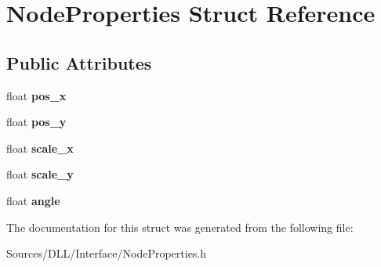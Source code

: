 \hypertarget{struct_node_properties}{}\section{Node\+Properties Struct Reference}
\label{struct_node_properties}
\subsection*{Public Attributes}
\begin{DoxyCompactItemize}
\item 
\hypertarget{struct_node_properties_a5c3926e71b48fc207c660879d3605b9c}{}float {\bfseries pos\+\_\+x}\label{struct_node_properties_a5c3926e71b48fc207c660879d3605b9c}

\item 
\hypertarget{struct_node_properties_ac367066fcf3484c36f71b9f8907207bc}{}float {\bfseries pos\+\_\+y}\label{struct_node_properties_ac367066fcf3484c36f71b9f8907207bc}

\item 
\hypertarget{struct_node_properties_a49637b6297462ecd714bf0cdf9584381}{}float {\bfseries scale\+\_\+x}\label{struct_node_properties_a49637b6297462ecd714bf0cdf9584381}

\item 
\hypertarget{struct_node_properties_a0efed2f7fd0a28c6a3a58bbf5e771d53}{}float {\bfseries scale\+\_\+y}\label{struct_node_properties_a0efed2f7fd0a28c6a3a58bbf5e771d53}

\item 
\hypertarget{struct_node_properties_a512b63456ff635298229e9b6207566ac}{}float {\bfseries angle}\label{struct_node_properties_a512b63456ff635298229e9b6207566ac}

\end{DoxyCompactItemize}


The documentation for this struct was generated from the following file\+:\begin{DoxyCompactItemize}
\item 
Sources/\+D\+L\+L/\+Interface/Node\+Properties.\+h\end{DoxyCompactItemize}
